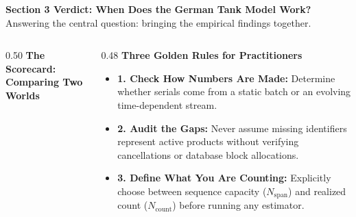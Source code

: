 \documentclass[aspectratio=169,10pt]{beamer}
\begin{document}
\begin{frame}[c]
  \begin{center}
    {\large \textbf{\color{headernavy} Section 3 Verdict: When Does the German Tank Model Work?}}\\[0.08cm]
    {\scriptsize \color{subgray} Answering the central question: bringing the empirical findings together.}
  \end{center}
  \vspace{0.25cm}
  
  \begin{columns}[t,onlytextwidth]
    \begin{column}{0.50\textwidth}
      {\small \textbf{\color{headernavy} The Scorecard: Comparing Two Worlds}}\\[0.06cm]
      {\scriptsize
      \begin{center}
      \end{center}}
    \end{column}%
    \begin{column}{0.48\textwidth}
      {\small \textbf{\color{accentblue} Three Golden Rules for Practitioners}}\\[0.06cm]
      {\scriptsize
      \begin{itemize}
        \setlength{\itemsep}{0.08cm}
        \item \textbf{1. Check How Numbers Are Made:} Determine whether serials come from a static batch or an evolving time-dependent stream.
        \item \textbf{2. Audit the Gaps:} Never assume missing identifiers represent active products without verifying cancellations or database block allocations.
        \item \textbf{3. Define What You Are Counting:} Explicitly choose between sequence capacity ($N_{\mathrm{span}}$) and realized count ($N_{\mathrm{count}}$) before running any estimator.
      \end{itemize}}
    \end{column}
  \end{columns}
  

\end{frame}
\end{document}
